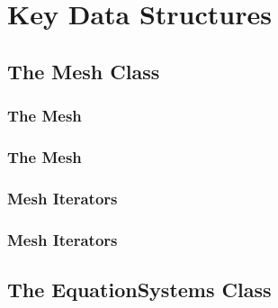 \section{Key Data Structures}

\subsection{The Mesh Class}
\begin{frame}[shrink]
  \frametitle{The Mesh}  
  
\end{frame}

\begin{frame}[shrink]
  \frametitle{The Mesh}  
  
\end{frame}

\begin{frame}[shrink]
  \frametitle{Mesh Iterators}  
  
\end{frame}

\begin{frame}[shrink]
  \frametitle{Mesh Iterators}  
  
\end{frame}





\subsection{The EquationSystems Class}
\begin{frame}[shrink]
  
\end{frame}
